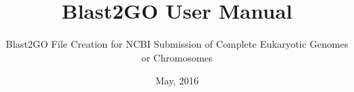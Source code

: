 

\pagestyle{empty}
\author{Blast2GO File Creation for NCBI Submission of Complete Eukaryotic
Genomes or Chromosomes}
\title{Blast2GO User Manual}
\date{May, 2016}
\maketitle
\tableofcontents
{}
\pagestyle{plain}

\newpage


